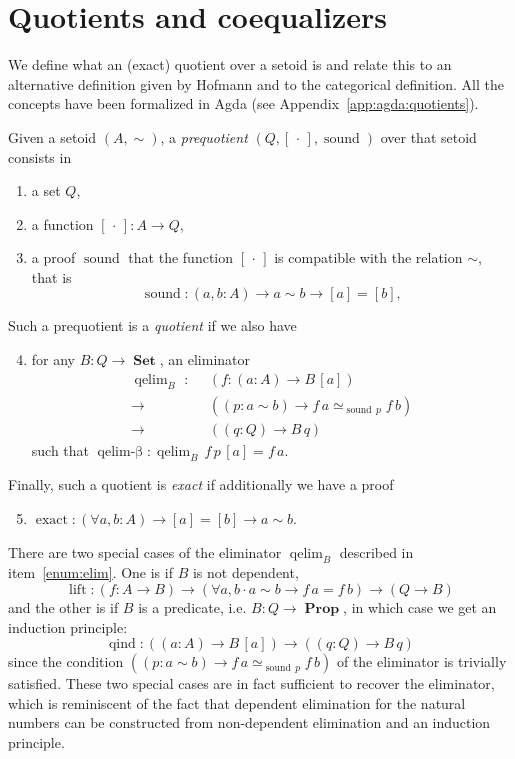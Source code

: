 \documentclass[envcountsame]{llncs}
\newcommand{\dotph}{\,\cdot\,} %
\providecommand{\class}[1]{[#1]}
\DeclareMathOperator{\Prop}{\mathbf{Prop}}
\DeclareMathOperator{\Set}{\mathbf{Set}}
\DeclareMathOperator{\sound}{sound}
\DeclareMathOperator{\qelimbeta}{qelim-\beta}
\DeclareMathOperator{\qind}{qind}
\DeclareMathOperator{\exact}{exact}
\DeclareMathOperator{\qelim}{qelim}
\DeclareMathOperator{\lift}{lift}
\renewcommand{\equiv}{=}
\begin{document}
\section{Quotients and coequalizers}\label{sec:quotients}

We define what an (exact) quotient over a setoid is and relate this to
an alternative definition given by Hofmann and to the categorical
definition. All the concepts have been formalized in Agda (see Appendix~\ref{app:agda:quotients}).

\begin{definition}
\label{def:quotient}

\noindent
Given a setoid $(A,\sim)$,  a \emph{prequotient} $(Q,\class\dotph,\sound)$ over that setoid consists in
\begin{enumerate}
\item \label{enum:Q} a set $Q$,
\item \label{enum:box}a function $\class\dotph: A \to Q$,
\item \label{enum:sound} a proof $\sound$ that  the function $\class\dotph$ is compatible with the relation $\sim$,
that is \[\sound\colon (a,b : A) \to a\sim b \to [a] = [b],\]
\end{enumerate}
Such a prequotient is a \emph{quotient} if  we also have\begin{enumerate}
\setcounter{enumi}{3}
\item \label{enum:elim}
for any $B: Q\to\Set$, an eliminator
 \begin{align*}
 \qelim_B\,\,:\,\,\,&(f\colon (a:A) \to B\,\class a) \\
        {\to}\, &((p:a\sim b) \to f\,a \simeq_{\sound\,p}f\,b)\\
        {\to}\, &((q:Q) \to B\,q)
 \end{align*}
such that $\qelimbeta : \qelim_B\,f \,p\,\class a\equiv f\,a$.

\end{enumerate}
Finally, such a quotient is \emph{exact} if additionally
we have
a proof\begin{enumerate}
\setcounter{enumi}{4}
\item $\exact :(\forall a,b : A) \to  \class a \equiv \class b \to a \sim b$.

\end{enumerate}
\end{definition}

There are two special cases of the eliminator $\qelim_B$ described in item~\ref{enum:elim}. One is if $B$ is not dependent,
 \[\lift\colon (f\colon A \to B) \to (\forall a,b\cdot a\sim b \to f\,a \equiv f\,b) \to (Q \to B)\]
and the other is if $B$ is a predicate, i.e. $B : Q\to \Prop$, in which case we get an induction principle:
\[\qind \colon((a: A)\to B \,\class a)\to ((q : Q)\to B\,q)\]
since the condition $((p:a\sim b) \to f\,a \simeq_{\sound\,p}f\,b) $  of  the eliminator is trivially satisfied.
These two special cases are in fact sufficient to recover the eliminator, which is reminiscent of the fact that dependent elimination for the natural numbers can be constructed from non-dependent elimination and an induction principle.
\end{document}
